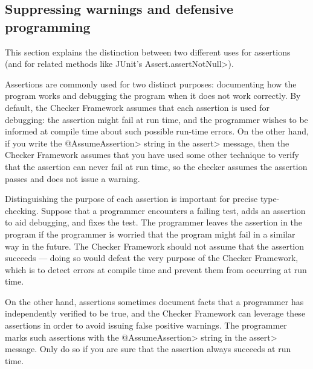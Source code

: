 \subsection{Suppressing warnings and defensive programming\label{defensive-programming}}

This section explains the distinction between two different uses for
assertions (and for related methods like JUnit's \<Assert.assertNotNull>).

Assertions are commonly used for two distinct purposes:  documenting how
the program works and debugging the program when it does not work
correctly.  By default, the Checker Framework assumes that each assertion
is used for debugging:  the assertion might fail at run time, and the programmer
wishes to be informed at compile time about such possible run-time errors.  On
the other hand, if you write the \<@AssumeAssertion> string in the \<assert>
message, then the Checker Framework assumes that you have used some other
technique to verify that the assertion can never fail at run time, so the
checker assumes the assertion passes and does not issue a warning.

Distinguishing the purpose of each assertion is important for precise
type-checking.
Suppose that a
programmer encounters a failing test, adds an assertion to aid debugging, and fixes the
test.  The programmer leaves the assertion in the program if the programmer
is worried that the program might fail in a similar way in the future.
The Checker Framework should not assume that the assertion succeeds ---
doing so would defeat the very purpose of the Checker Framework, which is
to detect errors at compile time and prevent them from occurring at run
time.

On the other hand, assertions sometimes document facts that a programmer
has independently verified to be true, and the Checker Framework can
leverage these assertions in order to avoid issuing false positive
warnings.  The programmer marks such assertions with the \<@AssumeAssertion>
string in the \<assert> message.  Only do so if you are sure
that the assertion always succeeds at run time.


